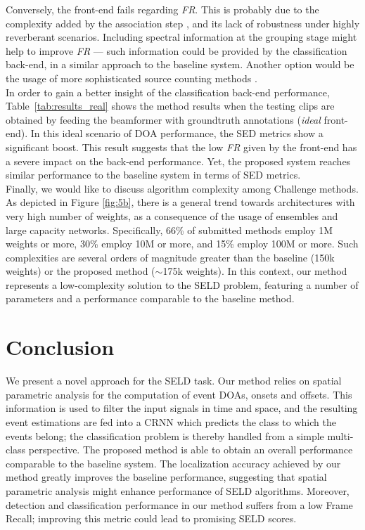 Conversely, the front-end fails regarding \textit{FR}. This is probably due to the complexity added by the association step \cite{Adavanne2018_JSTSP}, and its lack of robustness under highly reverberant scenarios. Including spectral information at the grouping stage might help to improve \textit{FR} --- such information could be provided by the classification back-end, in a similar approach to the baseline system. Another option would be the usage of more sophisticated source counting methods \cite{he2010detecting, Stefanakis2017}. \\

In order to gain a better insight of the classification back-end performance, Table~\ref{tab:results_real} shows the method results when the testing clips are obtained by feeding  the beamformer  with groundtruth annotations (\textit{ideal} front-end).
In this ideal scenario of DOA performance, the SED metrics show a significant boost. 
This result suggests that the low \textit{FR} given by the front-end has a severe impact on the back-end  performance.
Yet, the proposed system reaches similar performance to the baseline system in terms of SED metrics. \\

Finally, we would like to discuss algorithm complexity among Challenge methods. 
As depicted in Figure \ref{fig:5b}, there is a general trend towards architectures with very high number of weights, as a consequence of the usage of ensembles and large capacity networks.
Specifically, 66\% of submitted methods employ 1M weights or more, 30\% employ 10M or more, and 15\% employ 100M or more. Such complexities are several orders of magnitude greater than the baseline (150k weights) or the proposed method ($\sim$175k weights).
In this context, our method represents a low-complexity solution to the SELD problem, featuring a number of parameters and a performance comparable to the baseline method.


\section{Conclusion}
\label{sec:conclusion}

We present a novel approach for the SELD task. Our method relies on spatial parametric analysis for the computation of event DOAs, onsets and offsets. This information is used to filter the input signals in time and space, and the resulting event estimations are fed into a CRNN which predicts the class to which the events belong; the classification problem is thereby handled from a simple multi-class perspective.
The proposed method is able to obtain an overall performance comparable to the baseline system. 
The localization accuracy achieved by our method greatly improves the baseline performance, suggesting that spatial parametric analysis might enhance performance of SELD algorithms. Moreover, detection and classification performance in our method suffers from a low Frame Recall; improving this metric could lead to promising SELD scores.



